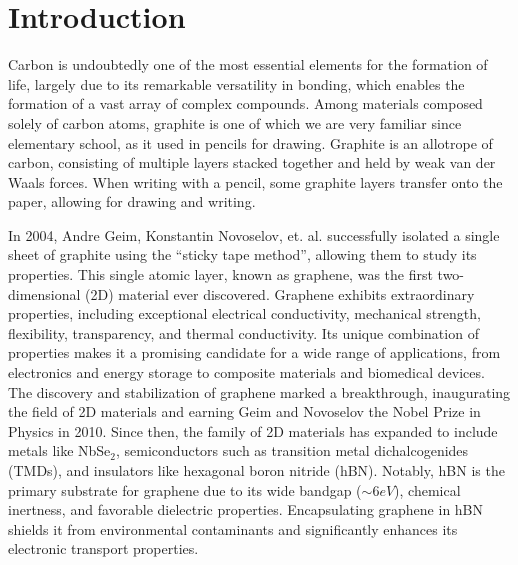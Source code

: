 



\chapter{Introduction} \label{ch:intro}

Carbon is undoubtedly one of the most essential elements for the formation of life, largely due to its remarkable versatility in bonding, which enables the formation of a vast array of complex compounds. Among materials composed solely of carbon atoms, graphite is one of which we are very familiar since elementary school, as it used in pencils for drawing. Graphite is an allotrope of carbon, consisting of multiple layers stacked together and held by weak van der Waals forces. When writing with a pencil, some graphite layers transfer onto the paper, allowing for drawing and writing.

In 2004, Andre Geim, Konstantin Novoselov, et. al. \cite{novoselov_2004} successfully isolated a single sheet of graphite using the ``sticky tape method'', allowing them to study its properties. This single atomic layer, known as graphene, was the first two-dimensional (2D) material ever discovered. Graphene exhibits extraordinary properties, including exceptional electrical conductivity, mechanical strength, flexibility, transparency, and thermal conductivity. Its unique combination of properties makes it a promising candidate for a wide range of applications, from electronics and energy storage to composite materials and biomedical devices. The discovery and stabilization of graphene marked a breakthrough, inaugurating the field of 2D materials and earning Geim and Novoselov the Nobel Prize in Physics in 2010. Since then, the family of 2D materials has expanded to include metals like NbSe\(_2\), semiconductors such as transition metal dichalcogenides (TMDs), and insulators like hexagonal boron nitride (hBN). Notably, hBN is the primary substrate for graphene due to its wide bandgap ($\sim 6 \unit{eV}$), chemical inertness, and favorable dielectric properties. Encapsulating graphene in hBN shields it from environmental contaminants and significantly enhances its electronic transport properties.

